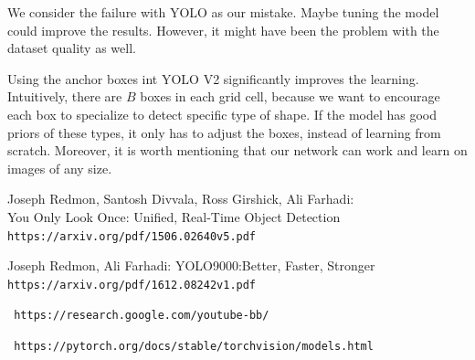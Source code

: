 \documentclass{article}
\begin{document}
We consider the failure with YOLO as our mistake. Maybe tuning the model could improve the results. However, it might have been the problem with the dataset quality as well.

Using the anchor boxes int YOLO V2 significantly improves the learning. Intuitively, there are $B$ boxes in each grid cell, because we want to encourage each box to specialize to detect specific type of shape. If the model has good priors of these types, it only has to adjust the boxes, instead of learning from scratch. Moreover, it is worth mentioning that our network can work and learn on images of any size.

\begin{thebibliography}{9}

Joseph Redmon, Santosh Divvala, Ross Girshick, Ali Farhadi:
\\You Only Look Once: Unified, Real-Time Object Detection
\\\texttt{https://arxiv.org/pdf/1506.02640v5.pdf}

Joseph Redmon, Ali Farhadi: YOLO9000:Better, Faster, Stronger
\\\texttt{https://arxiv.org/pdf/1612.08242v1.pdf}

\texttt{ https://research.google.com/youtube-bb/}

\texttt{ https://pytorch.org/docs/stable/torchvision/models.html }

\end{thebibliography}
\end{document}
